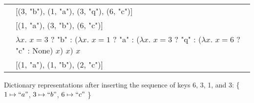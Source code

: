 \begin{teaserfigure}
\newcommand{\some}[1]
  {#1}
\newcommand{\none}[1]
  {None}
\centering
\newcommand{\lameq}[1]{$\lambda x$. $x = {#1}$}
\begin{tabular}{ l l }
 \Sal{} & [(3, "b"), (1, "a"), {\color{gray} (3, "q")}, (6, "c")] \\
 \Cal{} & [(1, "a"), (3, "b"), (6, "c")] \\ %
 \Fpf{} & \lameq{3} ? \some{"b"} : (\lameq{1} ? \some{"a"} : (\lameq{3} ? {\color{gray} \some{"q"}} : (\lameq{6} ? \some{"c"} : \none{}) $x$) $x$) $x$ \\
 \Dd{}  & [(1, "a"), (1, "b"), (2, "c")]
\end{tabular}
%
%
\caption{Dictionary representations after inserting the sequence of keys 6, 3, 1, and 3:
\{ $1 \mapsto ``a"$, $3 \mapsto ``b"$, $6 \mapsto ``c"$ \}
}
%
\label{fig:intro-example}
\vspace{0.15in} %
\end{teaserfigure}

